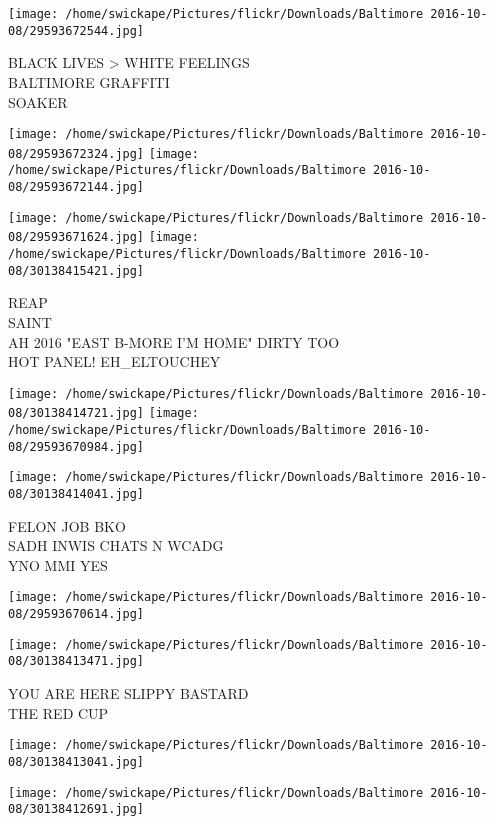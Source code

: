 \documentclass[10pt,letterpaper]{article}
\begin{document}
\vspace{0.25in}
\texttt{[image: /home/swickape/Pictures/flickr/Downloads/Baltimore 2016-10-08/29593672544.jpg]}

BLACK LIVES > WHITE FEELINGS\\
BALTIMORE GRAFFITI\\
SOAKER
\pagebreak

\texttt{[image: /home/swickape/Pictures/flickr/Downloads/Baltimore 2016-10-08/29593672324.jpg]}
\texttt{[image: /home/swickape/Pictures/flickr/Downloads/Baltimore 2016-10-08/29593672144.jpg]}

\texttt{[image: /home/swickape/Pictures/flickr/Downloads/Baltimore 2016-10-08/29593671624.jpg]}
\texttt{[image: /home/swickape/Pictures/flickr/Downloads/Baltimore 2016-10-08/30138415421.jpg]}

REAP\\
SAINT\\
AH 2016 "EAST B{-}MORE I'M HOME"  DIRTY TOO\\
HOT PANEL! EH\_ELTOUCHEY
\pagebreak

\texttt{[image: /home/swickape/Pictures/flickr/Downloads/Baltimore 2016-10-08/30138414721.jpg]}
\texttt{[image: /home/swickape/Pictures/flickr/Downloads/Baltimore 2016-10-08/29593670984.jpg]}

\texttt{[image: /home/swickape/Pictures/flickr/Downloads/Baltimore 2016-10-08/30138414041.jpg]}

FELON JOB BKO\\
SADH INWIS CHATS N WCADG\\
YNO MMI YES
\pagebreak

\texttt{[image: /home/swickape/Pictures/flickr/Downloads/Baltimore 2016-10-08/29593670614.jpg]}

\vspace{0.25in}
\texttt{[image: /home/swickape/Pictures/flickr/Downloads/Baltimore 2016-10-08/30138413471.jpg]}

YOU ARE HERE SLIPPY BASTARD\\
THE RED CUP
\pagebreak

\texttt{[image: /home/swickape/Pictures/flickr/Downloads/Baltimore 2016-10-08/30138413041.jpg]}

\vspace{0.25in}
\texttt{[image: /home/swickape/Pictures/flickr/Downloads/Baltimore 2016-10-08/30138412691.jpg]}
\end{document}
